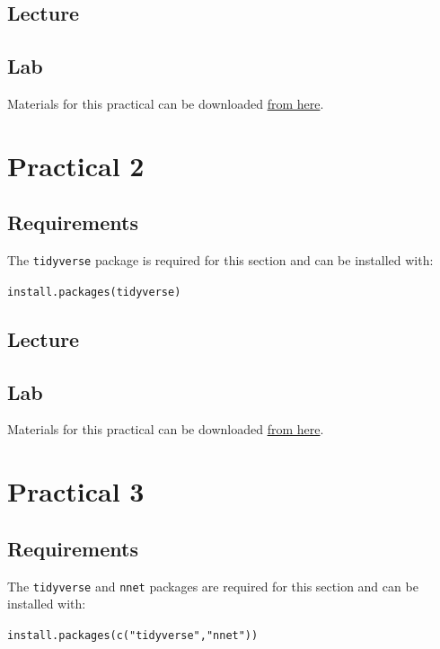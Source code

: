 \documentclass[
]{book}
\begin{document}
\section{Lecture}\label{lecture}

\section{Lab}\label{lab}

Materials for this practical can be downloaded \href{https://github.com/MJousse/IntroToR/}{from here}.

\chapter{Practical 2}\label{practical-2}

\section{Requirements}\label{requirements-1}

The \texttt{tidyverse} package is required for this section and can be installed with:

\texttt{install.packages(\textquotesingle{}tidyverse\textquotesingle{})}

\section{Lecture}\label{lecture-1}

\section{Lab}\label{lab-1}

Materials for this practical can be downloaded \href{https://github.com/AudreyBaguette/CBW25_Data-Wrangling}{from here}.

\chapter{Practical 3}\label{practical-3}

\section{Requirements}\label{requirements-2}

The \texttt{tidyverse} and \texttt{nnet} packages are required for this section and can be installed with:

\texttt{install.packages(c("tidyverse","nnet"))}
\end{document}
